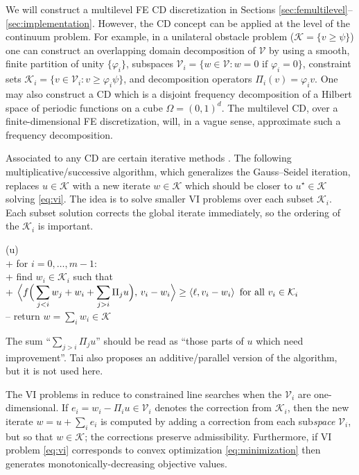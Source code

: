 \documentclass[review,hidelinks,onefignum,onetabnum]{siamart220329}
\newcommand{\cK}{\mathcal{K}}
\newcommand{\cV}{\mathcal{V}}
\newcommand{\ip}[2]{\left<#1,#2\right>}
\begin{document}
We will construct a multilevel FE CD discretization in Sections \ref{sec:femultilevel}--\ref{sec:implementation}.  However, the CD concept can be applied at the level of the continuum problem.  For example, in a unilateral obstacle problem ($\cK = \{v \ge \psi\}$) one can construct an overlapping domain decomposition of $\cV$ by using a smooth, finite partition of unity $\{\varphi_i\}$, subspaces $\cV_i = \{w \in \cV : w = 0 \text{ if } \varphi_i = 0\}$, constraint sets $\cK_i = \{v \in \cV_i : v \ge \varphi_i \psi\}$, and decomposition operators $\Pi_i(v) = \varphi_i v$.  One may also construct a CD which is a disjoint frequency decomposition of a Hilbert space of periodic functions on a cube $\Omega=(0,1)^d$.  The multilevel CD, over a finite-dimensional FE discretization, will, in a vague sense, approximate such a frequency decomposition.

Associated to any CD are certain iterative methods \cite{Tai2003,Xu1992}.  The following multiplicative/successive  algorithm, which generalizes the Gauss--Seidel iteration, replaces $u \in \cK$ with a new iterate $w\in\cK$ which should be closer to $u^\star \in \cK$ solving \eqref{eq:vi}.  The idea is to solve smaller VI problems over each subset $\cK_i$.  Each subset solution corrects the global iterate immediately, so the ordering of the $\cK_i$ is important.

\begin{pseudo*}
(u)\text{:} \\+
    for $i = 0,\dots,m-1$: \\+
        \rm{find} $w_i\in \cK_i$ \rm{such that} \\+
            $\displaystyle \Big<f\Big(\sum_{j<i} w_j + w_i + \sum_{j>i} \Pi_j u\Big),\, v_i - w_i\Big> \ge \ip{\ell}{v_i - w_i} \textnormal{ for all } v_i \in \cK_i$ \\--
    return $w=\sum_i w_i\in\cK$
\end{pseudo*}

\noindent The sum ``$\sum_{j>i} \Pi_j u$'' should be read as ``those parts of $u$ which need improvement''.  Tai \cite{Tai2003} also proposes an additive/parallel version of the algorithm, but it is not used here.

The VI problems in  reduce to constrained line searches when the $\cV_i$ are one-dimensional.  If $e_i = w_i - \Pi_i u \in \cV_i$ denotes the correction from $\cK_i$, then the new iterate $w = u + \sum_i e_i$ is computed by adding a correction from each sub\emph{space} $\cV_i$, but so that $w \in \cK$; the corrections preserve admissibility.  Furthermore, if VI problem \eqref{eq:vi} corresponds to convex optimization \eqref{eq:minimization} then  generates monotonically-decreasing objective values.
\end{document}
